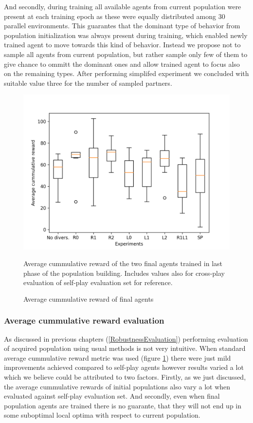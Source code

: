And secondly, during training all available agents from current population were present at each training epoch as these were equally distributed among 30 parallel environments.
This guarantes that the dominant type of behavior from population initialization was always present during training, which enabled newly trained agent to move towards this kind of behavior.
Instead we propose not to sample all agents from current population, but rather sample only few of them to give chance to ommitt the dominant ones and allow trained agent to focus also on the remaining types.
After performing simplifed experiment we concluded with suitable value three for the number of sampled partners.  


\begin{figure}[!ht]
    \centering
    \includegraphics*[width=14cm]{../img/SimpleCnnExperimentsAvg.png}

    \caption{Average cummulative reward of final agents}
    \label{AvgCummulativeRewardEvaluated}
    \medskip
    \small 
    Average cummulative reward of the two final agents trained in last phase of the population building.
    Includes values also for cross-play evaluation of self-play evaluation set for reference. 

\end{figure}

\subsubsection{Average cummulative reward evaluation}

As discussed in previous chapters (\ref{RobustnessEvaluation}) performing evaluation of acquired population using usual methods is not very intuitive. 
When standard average cummulative reward metric was used (figure \ref{AvgCummulativeRewardEvaluated}) there were just mild improvements achieved compared to self-play agents however results varied a lot which we believe could be attributed to two factors.
Firstly, as we just discussed, the average cummulative rewards of initial populations also vary a lot when evaluated against self-play evaluation set.
And secondly, even when final population agents are trained there is no guarante, that they will not end up in some suboptimal local optima with respect to current population.



